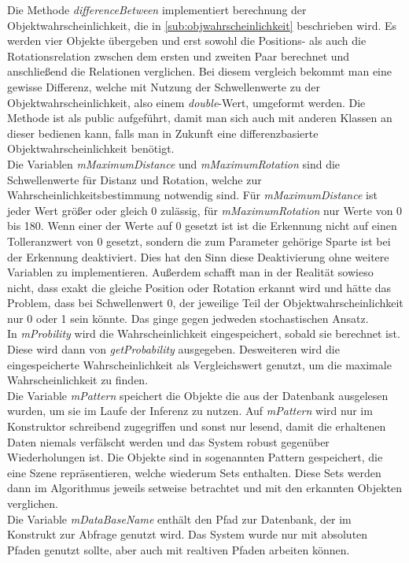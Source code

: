 Die Methode \textit{differenceBetween} implementiert berechnung der Objektwahrscheinlichkeit, die in \ref{sub:objwahrscheinlichkeit} beschrieben wird. Es werden vier Objekte übergeben und erst sowohl die Positions- als auch die Rotationsrelation zwschen dem ersten und zweiten Paar berechnet und anschließend die Relationen verglichen. Bei diesem vergleich bekommt man eine gewisse Differenz, welche mit Nutzung der Schwellenwerte zu der Objektwahrscheinlichkeit, also einem \textit{double}-Wert, umgeformt werden. Die Methode ist als public aufgeführt, damit man sich auch mit anderen Klassen an dieser bedienen kann, falls man in Zukunft eine differenzbasierte Objektwahrscheinlichkeit benötigt. \smallskip\\
Die Variablen \textit{mMaximumDistance} und \textit{mMaximumRotation} sind die Schwellenwerte für Distanz und Rotation, welche zur Wahrscheinlichkeitsbestimmung notwendig sind. Für \textit{mMaximumDistance} ist jeder Wert größer oder gleich 0 zulässig, für \textit{mMaximumRotation} nur Werte von 0 bis 180. Wenn einer der Werte auf 0 gesetzt ist ist die Erkennung nicht auf einen Tolleranzwert von 0 gesetzt, sondern die zum Parameter gehörige Sparte ist bei der Erkennung deaktiviert. Dies hat den Sinn diese Deaktivierung ohne weitere Variablen zu implementieren. Außerdem schafft man in der Realität sowieso nicht, dass exakt die gleiche Position oder Rotation erkannt wird und hätte das Problem, dass bei Schwellenwert 0, der jeweilige Teil der Objektwahrscheinlichkeit nur 0 oder 1 sein könnte. Das ginge gegen jedweden stochastischen Ansatz.\smallskip\\
In \textit{mProbility} wird die Wahrscheinlichkeit eingespeichert, sobald sie berechnet ist. Diese wird dann von \textit{getProbability} ausgegeben. Desweiteren wird die eingespeicherte Wahrscheinlichkeit als Vergleichswert genutzt, um die maximale Wahrscheinlichkeit zu finden.\smallskip\\
Die Variable \textit{mPattern} speichert die Objekte die aus der Datenbank ausgelesen wurden, um sie im Laufe der Inferenz zu nutzen. Auf \textit{mPattern} wird nur im Konstruktor schreibend zugegriffen und sonst nur lesend, damit die erhaltenen Daten niemals verfälscht werden und das System robust gegenüber Wiederholungen ist. Die Objekte sind in sogenannten Pattern gespeichert, die eine Szene repräsentieren, welche wiederum Sets enthalten. Diese Sets werden dann im Algorithmus jeweils setweise betrachtet und mit den erkannten Objekten verglichen.\smallskip\\
Die Variable \textit{mDataBaseName} enthält den Pfad zur Datenbank, der im Konstrukt zur Abfrage genutzt wird. Das System wurde nur mit absoluten Pfaden genutzt sollte, aber auch mit realtiven Pfaden arbeiten können.\smallskip\\

